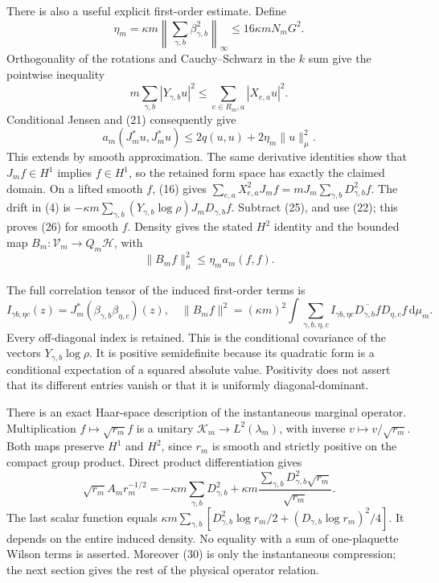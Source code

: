\documentclass[11pt]{article}
\newcommand{\dd}{\,\mathrm d}
\newcommand{\HH}{\mathscr H}
\newcommand{\KK}{\mathscr K}
\newcommand{\VV}{\mathscr V}
\begin{document}
There is also a useful explicit first-order estimate. Define
\[
 \eta_m=\kappa m\left\|\sum_{\gamma,b}\beta_{\gamma,b}^2\right\|_\infty
             \leq16\kappa mN_mG^2.
\]
Orthogonality of the rotations and Cauchy--Schwarz in the $k$ sum give
the pointwise inequality
\[
 m\sum_{\gamma,b}|Y_{\gamma,b}u|^2
 \leq\sum_{e\in R_m,a}|X_{e,a}u|^2.
\]
Conditional Jensen and (21) consequently give
\begin{equation}\label{eq:projectionbound}
 a_m(J_m^*u,J_m^*u)\leq2q(u,u)+2\eta_m\|u\|_\mu^2.
\end{equation}
This extends by smooth approximation. The same derivative identities
show that $J_mf\in H^1$ implies $f\in H^1$, so the retained form space
has exactly the claimed domain.
On a lifted smooth $f$, (16) gives
$\sum_{e,a}X_{e,a}^2J_mf=mJ_m\sum_{\gamma,b}D_{\gamma,b}^2f$.
The drift in (4) is
$-\kappa m\sum_{\gamma,b}(Y_{\gamma,b}\log\rho)J_mD_{\gamma,b}f$.
Subtract (25), and use (22); this proves
(26) for smooth $f$. Density gives the stated $H^2$ identity
and the bounded map $B_m:\VV_m\to Q_m\HH$, with
\begin{equation}\label{eq:Bbound}
 \|B_mf\|_\mu^2\leq\eta_m a_m(f,f).
\end{equation}



The full correlation tensor of the induced first-order terms is
\begin{equation}\label{eq:Fisher}
 I_{\gamma b,\eta c}(z)=J_m^*(\beta_{\gamma,b}\beta_{\eta,c})(z),\quad
 \|B_mf\|^2=(\kappa m)^2\int
 \sum_{\gamma,b,\eta,c}I_{\gamma b,\eta c}
              \overline{D_{\gamma,b}f}D_{\eta,c}f\dd\mu_m.
\end{equation}
Every off-diagonal index is retained. This is the conditional covariance
of the vectors $Y_{\gamma,b}\log\rho$. It is positive semidefinite
because its quadratic form is a conditional expectation of a squared
absolute value. Positivity does not assert that its different entries
vanish or that it is uniformly diagonal-dominant.

There is an exact Haar-space description of the instantaneous marginal
operator. Multiplication $f\mapsto\sqrt{r_m}f$ is a unitary
$\KK_m\to L^2(\lambda_m)$, with inverse
$v\mapsto v/\sqrt{r_m}$. Both maps preserve $H^1$ and $H^2$,
since $r_m$ is smooth and strictly positive on the compact group
product. Direct product differentiation gives
\begin{equation}\label{eq:marginalpotential}
 \sqrt{r_m}A_m r_m^{-1/2}
 =-\kappa m\sum_{\gamma,b}D_{\gamma,b}^2
       +\kappa m\frac{\sum_{\gamma,b}D_{\gamma,b}^2\sqrt{r_m}}{\sqrt{r_m}}.
\end{equation}
The last scalar function equals
$\kappa m\sum_{\gamma,b}[D_{\gamma,b}^2\log r_m/2
 +(D_{\gamma,b}\log r_m)^2/4]$.
It depends on the entire induced density. No equality with a sum of
one-plaquette Wilson terms is asserted. Moreover (30)
is only the instantaneous compression; the next section gives the rest
of the physical operator relation.
\end{document}

